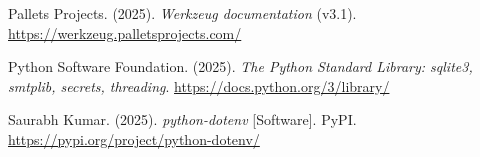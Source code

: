 \documentclass[12pt,letterpaper]{report}
\begin{document}
\begin{list}{}{\setlength{\itemindent}{-0.7cm}\setlength{\leftmargin}{0.7cm}
\setlength{\itemsep}{0.25cm}}
\item Pallets Projects. (2025). \textit{Werkzeug documentation} (v3.1).
  \url{https://werkzeug.palletsprojects.com/}

\item Python Software Foundation. (2025). \textit{The Python Standard
  Library: sqlite3, smtplib, secrets, threading}.
  \url{https://docs.python.org/3/library/}

\item Saurabh Kumar. (2025). \textit{python-dotenv} [Software]. PyPI.
  \url{https://pypi.org/project/python-dotenv/}

\end{list}
\end{document}
